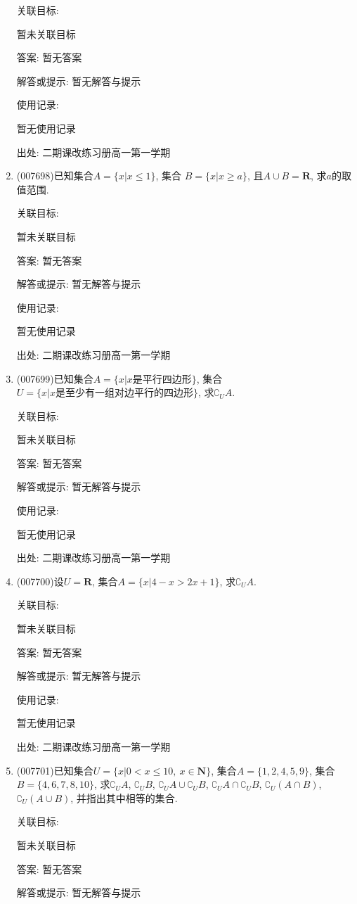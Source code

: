 \documentclass[10pt,a4paper]{article}
\begin{document}
\begin{enumerate}[1.]
关联目标:

暂未关联目标

答案: 暂无答案

解答或提示: 暂无解答与提示

使用记录:

暂无使用记录


出处: 二期课改练习册高一第一学期
\item { (007698)}已知集合$A=\{x|x\le 1\}$, 集合 $B=\{x|x\ge a\}$, 且$A\cup B=\mathbf{R}$, 求$a$的取值范围.


关联目标:

暂未关联目标

答案: 暂无答案

解答或提示: 暂无解答与提示

使用记录:

暂无使用记录


出处: 二期课改练习册高一第一学期
\item { (007699)}已知集合$A=\{x|x\text{是平行四边形}\}$, 集合$U=\{x|x\text{是至少有一组对边平行的四边形}\}$, 求$\complement _UA$.


关联目标:

暂未关联目标

答案: 暂无答案

解答或提示: 暂无解答与提示

使用记录:

暂无使用记录


出处: 二期课改练习册高一第一学期
\item { (007700)}设$U=\mathbf{R}$, 集合$A=\{x|4-x>2x+1\}$, 求$\complement _UA$.


关联目标:

暂未关联目标

答案: 暂无答案

解答或提示: 暂无解答与提示

使用记录:

暂无使用记录


出处: 二期课改练习册高一第一学期
\item { (007701)}已知集合$U=\{x|0<x\le 10, \ x\in \mathbf{N}\}$, 集合$A=\{1,2,4,5,9\}$, 集合$B=\{4,6,7,8,10\}$, 求$\complement _UA$, $\complement _UB$, $\complement _UA\cup \complement _UB$, $\complement _UA\cap \complement _UB$, $\complement _U(A\cap B)$, $\complement _U(A\cup B)$, 并指出其中相等的集合.


关联目标:

暂未关联目标

答案: 暂无答案

解答或提示: 暂无解答与提示


\end{enumerate}
\end{document}
